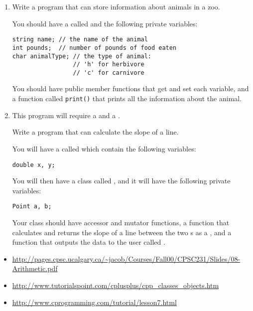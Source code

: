 \begin{enumerate}
\item Write a program that can store information about animals in a zoo.

You should have a  called  and the following private variables: \nopagebreak[4]

\noindent\begin{minipage}{\linewidth}\begin{lstlisting}
string name; // the name of the animal
int pounds;  // number of pounds of food eaten
char animalType; // the type of animal: 
                 // 'h' for herbivore
                 // 'c' for carnivore
\end{lstlisting}\end{minipage}

You should have public member functions that get and set each variable, and a function called \texttt{print()} that prints all the information about the animal.

\item This program will require a  and a .

Write a program that can calculate the slope of a line.

You will have a  called  which contain the following variables:

\noindent\begin{minipage}{\linewidth}\begin{lstlisting}
double x, y;
\end{lstlisting}\end{minipage}

You will then have a class called , and it will have the following private variables:

\noindent\begin{minipage}{\linewidth}\begin{lstlisting}
Point a, b;
\end{lstlisting}\end{minipage}

Your class should have accessor and mutator functions, a function that calculates and returns the slope of a line between the two s as a , and a function that outputs the data to the user called .
\end{enumerate}





\begin{itemize}
\item \url{http://pages.cpsc.ucalgary.ca/~jacob/Courses/Fall00/CPSC231/Slides/08-Arithmetic.pdf}
\item \url{http://www.tutorialspoint.com/cplusplus/cpp_classes_objects.htm}
\item \url{http://www.cprogramming.com/tutorial/lesson7.html}
\end{itemize}	

